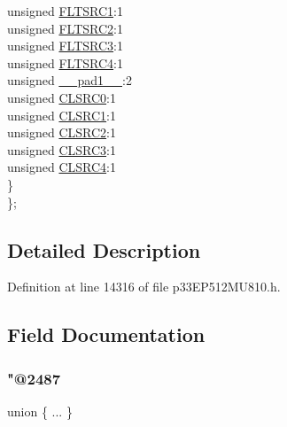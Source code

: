 \begin{DoxyCompactItemize}
\begin{tabbing}
\>\>unsigned \hyperlink{structtag_f_c_l_c_o_n2_b_i_t_s_a7e2dde44582a2b4411afb97f93704738}{FLTSRC1}:1\\
\>\>unsigned \hyperlink{structtag_f_c_l_c_o_n2_b_i_t_s_a41a56979130beaf62e52443409af0daf}{FLTSRC2}:1\\
\>\>unsigned \hyperlink{structtag_f_c_l_c_o_n2_b_i_t_s_a919f99b1241a5f4d92f40778ec6b91a8}{FLTSRC3}:1\\
\>\>unsigned \hyperlink{structtag_f_c_l_c_o_n2_b_i_t_s_afedaf58b1e4d19481bb47b44b59ecbc3}{FLTSRC4}:1\\
\>\>unsigned \hyperlink{structtag_f_c_l_c_o_n2_b_i_t_s_acaf2d0924a107ec6e8d2e31febaf66f9}{\_\_pad1\_\_}:2\\
\>\>unsigned \hyperlink{structtag_f_c_l_c_o_n2_b_i_t_s_a0a945873cb44d41b241b83b08b599880}{CLSRC0}:1\\
\>\>unsigned \hyperlink{structtag_f_c_l_c_o_n2_b_i_t_s_a59f38630bf59c0035792456d75d03410}{CLSRC1}:1\\
\>\>unsigned \hyperlink{structtag_f_c_l_c_o_n2_b_i_t_s_a24cd8f779980ba4b721ab1d0d63648de}{CLSRC2}:1\\
\>\>unsigned \hyperlink{structtag_f_c_l_c_o_n2_b_i_t_s_a86b531e28879dfb3db317ce2147d381e}{CLSRC3}:1\\
\>\>unsigned \hyperlink{structtag_f_c_l_c_o_n2_b_i_t_s_a438bb199cbcc62bfd380ead48036accc}{CLSRC4}:1\\
\>\} \\
\}; \\

\end{tabbing}\end{DoxyCompactItemize}


\subsection{Detailed Description}


Definition at line 14316 of file p33\+E\+P512\+M\+U810.\+h.



\subsection{Field Documentation}
\mbox{\label{structtag_f_c_l_c_o_n2_b_i_t_s_a351e79462491a38b9dc2583e5a87ed6a}} 
\subsubsection{\texorpdfstring{"@2487}{@2487}}
{\footnotesize\ttfamily union \{ ... \} }

